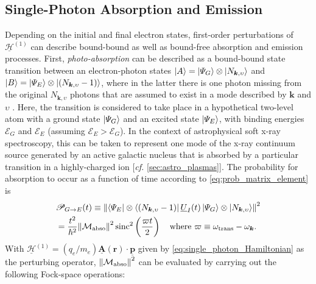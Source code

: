 \subsection{Single-Photon Absorption and Emission}\label{sec:single_absorption_emission} 
Depending on the initial and final electron states, first-order perturbations of $\underline{\mathcal{H}}^{(1)}$ can describe bound-bound as well as bound-free absorption and emission processes. 
First, \emph{photo-absorption} can be described as a bound-bound state transition between an electron-photon states $\ket{A} = \ket{\Psi_G} \otimes \ket{N_{\mathbold{k},\upsilon}}$ and $\ket{B} = \ket{\Psi_E} \otimes \ket{\left( N_{\mathbold{k},\upsilon} - 1 \right)}$, where in the latter there is one photon missing from the original $N_{\mathbold{k},\upsilon}$ photons that are assumed to exist in a mode described by $\mathbold{k}$ and $\upsilon$ \cite{Townsend00}. 
Here, the transition is considered to take place in a hypothetical two-level atom with a ground state $\ket{\Psi_G}$ and an excited state $\ket{\Psi_E}$, with binding energies $\mathcal{E}_G$ and $\mathcal{E}_E$ (assuming $\mathcal{E}_E > \mathcal{E}_G$).
In the context of astrophysical soft x-ray spectroscopy, this can be taken to represent one mode of the x-ray continuum source generated by an active galactic nucleus that is absorbed by a particular transition in a highly-charged ion [\emph{cf.\@} \cref{sec:astro_plasmas}]. 
The probability for absorption to occur as a function of time according to \cref{eq:prob_matrix_element} is \cite{Shankar04,Townsend00,kapitell4,wysin2011quantization} 
\begin{align}\label{eq:absorption_evolution4}
 \begin{split}
 &\mathscr{P}_{G \to E} (t) \equiv \norm{\bra{\Psi_E} \otimes \bra{\left( N_{\mathbold{k},\upsilon} -1 \right)} \underline{U}_I (t) \ket{\Psi_G} \otimes \ket{N_{\mathbold{k},\upsilon}}}^2 \\
 &= \frac{t^2}{\hbar^2} \norm{\mathcal{M}_{\text{abso}}}^2 \sinc^2 \left( \frac{\varpi t}{2} \right) \quad \text{where } \varpi \equiv \omega_{\text{trans}} - \omega_{\mathbold{k}} .
 \end{split}
 \end{align}
With $\underline{\mathcal{H}}^{(1)} = \left( q_e / m_e \right) \underline{\mathbold{A}} ( \mathbold{r} ) \cdot \underline{\mathbold{p}}$ given by \cref{eq:single_photon_Hamiltonian} as the perturbing operator, $\norm{\mathcal{M}_{\text{abso}}}^2$ can be evaluated by carrying out the following Fock-space operations: 
